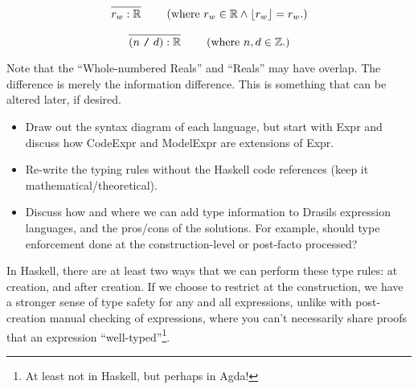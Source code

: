 \begin{equation}
      \left.
      \infer{r_w : \bb{R}}{}
      \right.
      \qquad
      \text{(where \(r_w \in \bb{R} \land \lfloor{} r_w \rfloor{} = r_w\).)}
      \label{tr:lit:wholeReal}
\end{equation}

\begin{equation}
      \left.
      \infer{(n\ \texttt{/}\ d) : \bb{R}}{}
      \right.
      \qquad
      \text{(where \(n, d \in \bb{Z}\).)}
      \label{tr:lit:fraction}
\end{equation}

Note that the ``Whole-numbered Reals'' and ``Reals'' may have overlap. The
difference is merely the information difference. This is something that can be
altered later, if desired.






\begin{itemize}
      \item Draw out the syntax diagram of each language, but start with Expr
            and discuss how CodeExpr and ModelExpr are extensions of Expr.

      \item Re-write the typing rules without the Haskell code references (keep
            it mathematical/theoretical).

      \item Discuss how and where we can add type information to Drasils
            expression languages, and the pros/cons of the solutions. For
            example, should type enforcement done at the construction-level or
            post-facto processed?
\end{itemize}

In Haskell, there are at least two ways that we can perform these type rules: at
creation, and after creation. If we choose to restrict at the construction, we
have a stronger sense of type safety for any and all expressions, unlike with
post-creation manual checking of expressions, where you can't necessarily share
proofs that an expression ``well-typed''\footnote{At least not in Haskell, but
      perhaps in Agda!}.

